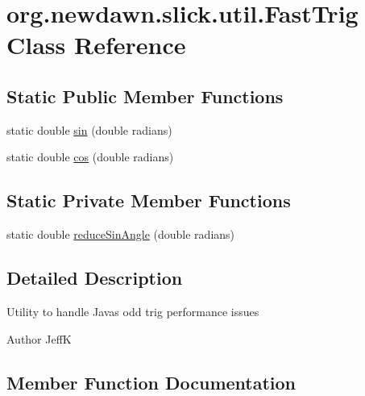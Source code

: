 \hypertarget{classorg_1_1newdawn_1_1slick_1_1util_1_1_fast_trig}{}\section{org.\+newdawn.\+slick.\+util.\+Fast\+Trig Class Reference}
\label{classorg_1_1newdawn_1_1slick_1_1util_1_1_fast_trig}
\subsection*{Static Public Member Functions}
\begin{DoxyCompactItemize}
\item 
static double \mbox{\hyperlink{classorg_1_1newdawn_1_1slick_1_1util_1_1_fast_trig_afb5f3af5e68974ea439119bd3eb365a5}{sin}} (double radians)
\item 
static double \mbox{\hyperlink{classorg_1_1newdawn_1_1slick_1_1util_1_1_fast_trig_a1839bed93db3a122acadd8abc2580d11}{cos}} (double radians)
\end{DoxyCompactItemize}
\subsection*{Static Private Member Functions}
\begin{DoxyCompactItemize}
\item 
static double \mbox{\hyperlink{classorg_1_1newdawn_1_1slick_1_1util_1_1_fast_trig_a91525588388e9e09ba6694764a77545b}{reduce\+Sin\+Angle}} (double radians)
\end{DoxyCompactItemize}


\subsection{Detailed Description}
Utility to handle Java\textquotesingle{}s odd trig performance issues

\begin{DoxyAuthor}{Author}
JeffK 
\end{DoxyAuthor}


\subsection{Member Function Documentation}
\mbox{\label{classorg_1_1newdawn_1_1slick_1_1util_1_1_fast_trig_a1839bed93db3a122acadd8abc2580d11}} 
